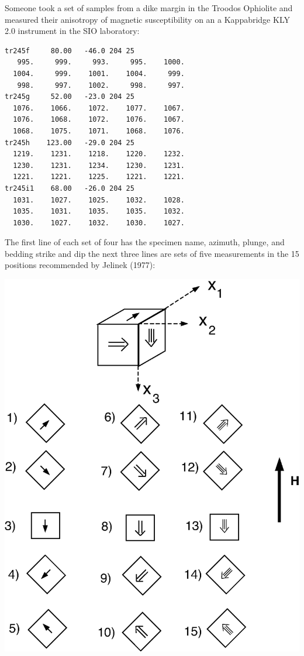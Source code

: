 \documentclass[11pt]{book}
\begin{document}
{{Someone took a set of samples from a dike margin in the Troodos Ophiolite and measured their anisotropy of magnetic susceptibility on an a Kappabridge KLY 2.0 instrument in the SIO laboratory:

\begin{verbatim}
tr245f     80.00   -46.0 204 25
   995.     999.     993.     995.    1000.
  1004.     999.    1001.    1004.     999.
   998.     997.    1002.     998.     997.
tr245g     52.00   -23.0 204 25
  1076.    1066.    1072.    1077.    1067.
  1076.    1068.    1072.    1076.    1067.
  1068.    1075.    1071.    1068.    1076.
tr245h    123.00   -29.0 204 25
  1219.    1231.    1218.    1220.    1232.
  1230.    1231.    1234.    1230.    1231.
  1221.    1221.    1225.    1221.    1221.
tr245i1    68.00   -26.0 204 25
  1031.    1027.    1025.    1032.    1028.
  1035.    1031.    1035.    1035.    1032.
  1030.    1027.    1032.    1030.    1027.
  \end{verbatim}

  The first line of each set of four has the specimen name, azimuth, plunge, and bedding strike and dip
  the next three lines are sets of five measurements in the 15 positions
 recommended by Jelinek (1977):  \nocite{jelinek77}

  \includegraphics[width=15cm]{EPSfiles/meas15.eps}


}}
\end{document}
